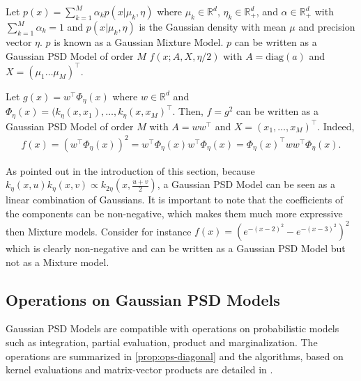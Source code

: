 \begin{example}\label{ex:mixtures} Let $p(x) = \sum_{k=1}^M\alpha_kp(x|\mu_k, \eta)$ where $\mu_k\in\mathbb R^d$, $\eta_k\in\mathbb R^d_+$, and $\alpha \in\mathbb R^d_+$ with $\sum_{k=1}^M\alpha_k = 1$ and $p(x|\mu_k, \eta)$ is the Gaussian density with mean $\mu$ and precision vector $\eta$. $p$ is known as a Gaussian Mixture Model. $p$ can be written as a Gaussian PSD Model of order $M$ $f(x ; A, X, \eta / 2)$ with $A=\textrm{diag}(a)$ and $X = (\mu_1 \ldots \mu_M)^\top $.
\end{example}

\begin{example}\label{ex:sq-linear-model}
Let $g(x) = w^\top \Phi_\eta(x)$ where $w\in\mathbb R^d$ and $\Phi_\eta(x)= (k_\eta(x, x_1), \ldots, k_\eta(x, x_M)^\top $. Then, $f=g^2$ can be written as a Gaussian PSD Model of order $M$ with $A=ww^\top $ and $X = (x_1, \ldots, x_M)^\top $. Indeed,
\begin{align}
    f(x) = (w^\top \Phi_\eta(x))^2 = w^\top \Phi_\eta(x)w^\top \Phi_\eta(x) = \Phi_\eta(x)^\top ww^\top \Phi_\eta(x).
\end{align}
\end{example}

\noindent As pointed out in the introduction of this section, because $k_\eta(x, u)k_\eta(x, v)\propto k_{2\eta}(x, \frac{u+v}{2})$, a Gaussian PSD Model can be seen as a linear combination of Gaussians. It is important to note that the coefficients of the components can be non-negative, which makes them much more expressive then Mixture models. Consider for instance $f(x) = (e^{-(x-2)^2} - e^{-(x-3)^2})^2$ which is clearly non-negative and can be written as a Gaussian PSD Model but not as a Mixture model.

\subsection{Operations on Gaussian PSD Models}
Gaussian PSD Models are compatible with operations on probabilistic models such as integration, partial evaluation, product and marginalization. The operations are summarized in \cref{prop:ops-diagonal} and the algorithms, based on kernel evaluations and matrix-vector products are detailed in \cite{ciliberto2021}.

